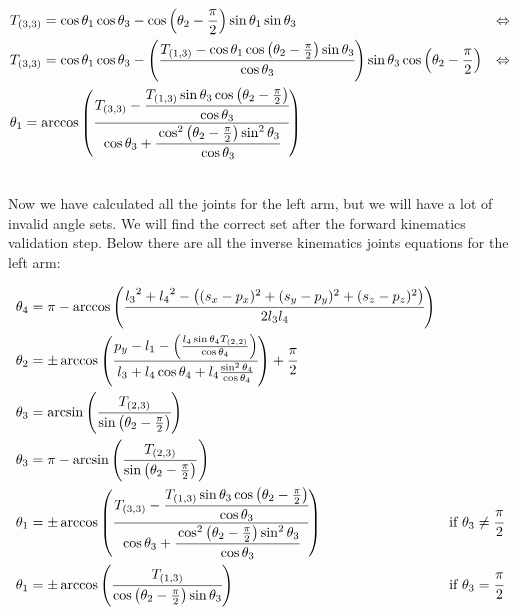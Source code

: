 \begin{small}
\begin{align*}
&T_{(3,3)} = \cos\theta_1\cos\theta_3 - \cos\left(\theta_2 - \frac{\pi}{2}\right)\sin\theta_1\sin\theta_3 &\Leftrightarrow \\
&T_{(3,3)} = \cos\theta_1\cos\theta_3 - \left(\cfrac{T_{(1,3)} - \cos\theta_1\cos\left(\theta_2 - \frac{\pi}{2}\right)\sin\theta_3}{\cos\theta_3}\right)\sin\theta_3\cos\left(\theta_2 - \frac{\pi}{2}\right) &\Leftrightarrow \\
&\theta_1 = \arccos\left(\cfrac{T_{(3,3)} -\cfrac{ T_{(1,3)}\sin\theta_3\cos\left(\theta_2 - \frac{\pi}{2}\right)}{\cos\theta_3}}{\cos\theta_3 + \cfrac{\cos^2\left(\theta_2-\frac{\pi}{2}\right)\sin^2\theta_3}{\cos\theta_3}}\right)
\end{align*}
\end{small}\\
Now we have calculated all the joints for the left arm, but we will have a lot of invalid angle sets. We will find the correct set after the forward kinematics validation step. Below there are all the inverse kinematics joints equations for the left arm:

\begin{small}
\begin{align*}
\theta_4 &= \pi - \arccos\left(\cfrac{{l_3}^2 + {l_4}^2 - \left( (s_x-p_x)^2 + (s_y-p_y)^2 + (s_z-p_z)^2 \right)}{2 l_3 l_4}\right)\\
\theta_2 &= \pm\arccos\left(\cfrac{p_y - l_1 - \left(\frac{l_4\sin\theta_4 T_{(2,2)}}{\cos\theta_4}\right)}{l_3 +l_4\cos\theta_4 + l_4\frac{\sin^2\theta_4}{\cos\theta_4}}\right)+\cfrac{\pi}{2}\\
\theta_3 &= \arcsin\left(\cfrac{T_{(2,3)}}{\sin\left(\theta_2-\frac{\pi}{2}\right)}\right)\\
\theta_3 &= \pi - \arcsin\left(\frac{T_{(2,3)}}{\sin\left(\theta_2-\frac{\pi}{2}\right)}\right)\\
\theta_1 &= \pm\arccos\left(\cfrac{T_{(3,3)} - \cfrac{T_{(1,3)}\sin\theta_3\cos\left(\theta_2 - \frac{\pi}{2}\right)}{\cos\theta_3}}{\cos\theta_3 + \cfrac{\cos^2\left(\theta_2-\frac{\pi}{2}\right)\sin^2\theta_3}{\cos\theta_3}}\right) &\text{if } \theta_3 \neq \cfrac{\pi}{2}\\
\theta_1 &= \pm\arccos\left(\cfrac{T_{(1,3)}}{\cos\left(\theta_2 - \frac{\pi}{2}\right)\sin\theta_3}\right) &\text{if } \theta_3 = \cfrac{\pi}{2}
\end{align*}
\end{small}

